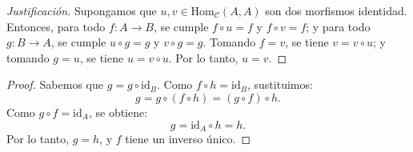\begin{proof}[Justificación]
	Supongamos que $u, v \in \mathrm{Hom}_{\mathcal{C}}(A, A)$ son dos morfismos identidad. Entonces, para todo $f : A \to B$, se cumple $f \circ u = f$ y $f \circ v = f$; y para todo $g : B \to A$, se cumple $u \circ g = g$ y $v \circ g = g$. Tomando $f = v$, se tiene $v = v \circ u$; y tomando $g = u$, se tiene $u = v \circ u$. Por lo tanto, $u = v$.
\end{proof}

\begin{proposicion}
\end{proposicion}

\begin{proof}
    Sabemos que $g = g \circ \mathrm{id}_B$. Como $f \circ h = \mathrm{id}_B$, sustituimos:
	$$
	g = g \circ (f \circ h) = (g \circ f) \circ h.
	$$
	Como $g \circ f = \mathrm{id}_A$, se obtiene:
	$$
	g = \mathrm{id}_A \circ h = h.
	$$
	Por lo tanto, $g = h$, y $f$ tiene un inverso único.
\end{proof}

\begin{definicion}
\end{definicion}



